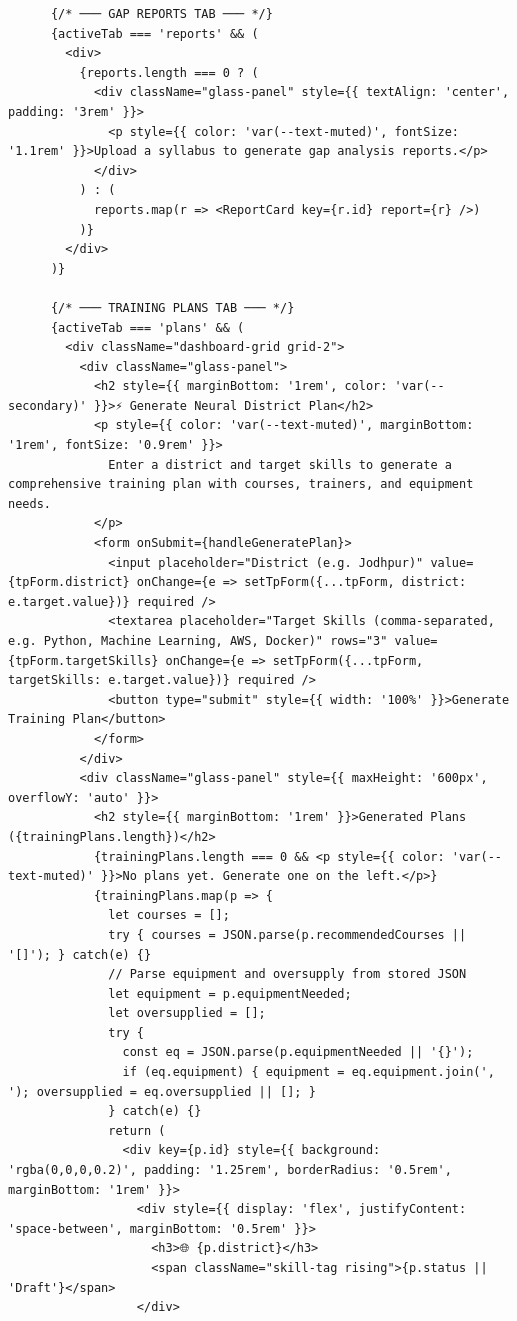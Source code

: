 \documentclass[12pt,a4paper]{report}
\begin{document}
\begin{verbatim}
      {/* ─── GAP REPORTS TAB ─── */}
      {activeTab === 'reports' && (
        <div>
          {reports.length === 0 ? (
            <div className="glass-panel" style={{ textAlign: 'center', padding: '3rem' }}>
              <p style={{ color: 'var(--text-muted)', fontSize: '1.1rem' }}>Upload a syllabus to generate gap analysis reports.</p>
            </div>
          ) : (
            reports.map(r => <ReportCard key={r.id} report={r} />)
          )}
        </div>
      )}

      {/* ─── TRAINING PLANS TAB ─── */}
      {activeTab === 'plans' && (
        <div className="dashboard-grid grid-2">
          <div className="glass-panel">
            <h2 style={{ marginBottom: '1rem', color: 'var(--secondary)' }}>⚡ Generate Neural District Plan</h2>
            <p style={{ color: 'var(--text-muted)', marginBottom: '1rem', fontSize: '0.9rem' }}>
              Enter a district and target skills to generate a comprehensive training plan with courses, trainers, and equipment needs.
            </p>
            <form onSubmit={handleGeneratePlan}>
              <input placeholder="District (e.g. Jodhpur)" value={tpForm.district} onChange={e => setTpForm({...tpForm, district: e.target.value})} required />
              <textarea placeholder="Target Skills (comma-separated, e.g. Python, Machine Learning, AWS, Docker)" rows="3" value={tpForm.targetSkills} onChange={e => setTpForm({...tpForm, targetSkills: e.target.value})} required />
              <button type="submit" style={{ width: '100%' }}>Generate Training Plan</button>
            </form>
          </div>
          <div className="glass-panel" style={{ maxHeight: '600px', overflowY: 'auto' }}>
            <h2 style={{ marginBottom: '1rem' }}>Generated Plans ({trainingPlans.length})</h2>
            {trainingPlans.length === 0 && <p style={{ color: 'var(--text-muted)' }}>No plans yet. Generate one on the left.</p>}
            {trainingPlans.map(p => {
              let courses = [];
              try { courses = JSON.parse(p.recommendedCourses || '[]'); } catch(e) {}
              // Parse equipment and oversupply from stored JSON
              let equipment = p.equipmentNeeded;
              let oversupplied = [];
              try {
                const eq = JSON.parse(p.equipmentNeeded || '{}');
                if (eq.equipment) { equipment = eq.equipment.join(', '); oversupplied = eq.oversupplied || []; }
              } catch(e) {}
              return (
                <div key={p.id} style={{ background: 'rgba(0,0,0,0.2)', padding: '1.25rem', borderRadius: '0.5rem', marginBottom: '1rem' }}>
                  <div style={{ display: 'flex', justifyContent: 'space-between', marginBottom: '0.5rem' }}>
                    <h3>🌐 {p.district}</h3>
                    <span className="skill-tag rising">{p.status || 'Draft'}</span>
                  </div>


\end{verbatim}
\end{document}
